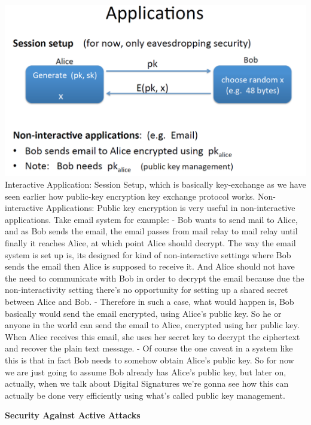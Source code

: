 \documentclass[11pt]{article}
\makeatletter
\def\maxwidth{\ifdim\Gin@nat@width>\linewidth\linewidth
    \else\Gin@nat@width\fi}
\let\Oldincludegraphics\includegraphics
\renewcommand{\includegraphics}[1]{\Oldincludegraphics[width=.8\maxwidth]{#1}}
\makeatother
\begin{document}
\includegraphics{./Images/PKEnc-Application.png} Interactive
Application: Session Setup, which is basically key-exchange as we have
seen earlier how public-key encryption key exchange protocol works.
Non-interactive Applications: Public key encryption is very useful in
non-interactive applications. Take email system for example: - Bob wants
to send mail to Alice, and as Bob sends the email, the email passes from
mail relay to mail relay until finally it reaches Alice, at which point
Alice should decrypt. The way the email system is set up is, its
designed for kind of non-interactive settings where Bob sends the email
then Alice is supposed to receive it. And Alice should not have the need
to communicate with Bob in order to decrypt the email because due the
non-interactivity setting there's no opportunity for setting up a shared
secret between Alice and Bob. - Therefore in such a case, what would
happen is, Bob basically would send the email encrypted, using Alice's
public key. So he or anyone in the world can send the email to Alice,
encrypted using her public key. When Alice receives this email, she uses
her secret key to decrypt the ciphertext and recover the plain text
message. - Of course the one caveat in a system like this is that in
fact Bob needs to somehow obtain Alice's public key. So for now we are
just going to assume Bob already has Alice's public key, but later on,
actually, when we talk about Digital Signatures we're gonna see how this
can actually be done very efficiently using what's called public key
management.

\textbf{Security Against Active Attacks}
\end{document}
